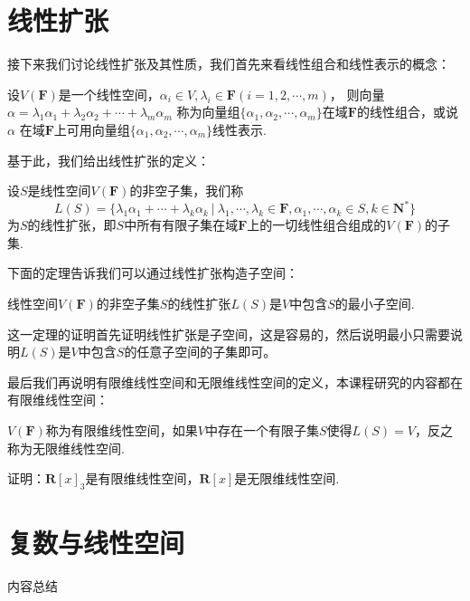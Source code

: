 \section{线性扩张}
接下来我们讨论线性扩张及其性质，我们首先来看线性组合和线性表示的概念：
\begin{definition}
	设$V(\mathbf{F})$是一个线性空间，$\alpha_i\in V,\lambda_i\in \mathbf{F}(i=1,2,\cdots,m)$，
	则向量$\alpha=\lambda_1\alpha_1+\lambda_2\alpha_2+\cdots+\lambda_m\alpha_m$
	称为向量组$\{\alpha_1,\alpha_2,\cdots,\alpha_m\}$在域$\mathbf{F}$的线性组合，或说$\alpha$
	在域$\mathbf{F}$上可用向量组$\{\alpha_1,\alpha_2,\cdots,\alpha_m\}$线性表示.
\end{definition}
基于此，我们给出线性扩张的定义：
\begin{definition}
	设$S$是线性空间$V(\mathbf{F})$的非空子集，我们称
	$$L(S)=\{\lambda_1\alpha_1+\cdots+\lambda_k\alpha_k\ |\ \lambda_1,\cdots,\lambda_k\in\mathbf{F},\alpha_1,\cdots,\alpha_k\in S,k\in\mathbf{N^*}\}$$
	为$S$的线性扩张，即$S$中所有有限子集在域$\mathbf{F}$上的一切线性组合组成的$V(\mathbf{F})$的子集.
\end{definition}
下面的定理告诉我们可以通过线性扩张构造子空间：
\begin{theorem}
	线性空间$V(\mathbf{F})$的非空子集$S$的线性扩张$L(S)$是$V$中包含$S$的最小子空间.
\end{theorem}
这一定理的证明首先证明线性扩张是子空间，这是容易的，然后说明最小只需要说明$L(S)$是$V$中包含$S$的任意子空间的子集即可。

最后我们再说明有限维线性空间和无限维线性空间的定义，本课程研究的内容都在有限维线性空间：
\begin{definition}
	$V(\mathbf{F})$称为有限维线性空间，如果$V$中存在一个有限子集$S$使得$L(S)=V$，反之称为无限维线性空间.
\end{definition}
\begin{example}
	证明：$\mathbf{R}[x]_3$是有限维线性空间，$\mathbf{R}[x]$是无限维线性空间.
\end{example}

\section{复数与线性空间}

\vspace{2ex} 
\centerline{\heiti \Large 内容总结}

\vspace{2ex} 

